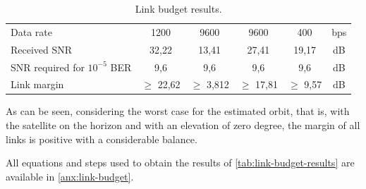 \begin{table}[!h]
\begin{tabular}{L{0.3\textwidth}ccccc}
        Data rate                       & 1200          & 9600          & 9600          & 400           & bps \\
        Received SNR                    & 32,22         & 13,41         & 27,41         & 19,17         & dB \\
        SNR required for $10^{-5}$ BER\footnotemark & 9,6           & 9,6           & 9,6           & 9,6           & dB \\
        Link margin                     & $\geq$ 22,62  & $\geq$ 3,812  & $\geq$ 17,81  & $\geq$ 9,57   & dB \\
        \bottomrule[1.5pt]
    \end{tabular}
    \caption{Link budget results.}
    \label{tab:link-budget-results}
\end{table}


As can be seen, considering the worst case for the estimated orbit, that is, with the satellite on the horizon and with an elevation of zero degree, the margin of all links is positive with a considerable balance.

All equations and steps used to obtain the results of \autoref{tab:link-budget-results} are available in \autoref{anx:link-budget}.
